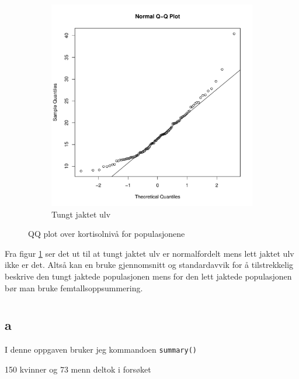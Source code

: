 \begin{figure}[H]
\begin{subfigure}{0.5\textwidth}
        \includegraphics[width=\linewidth]{TUNGT.pdf}
        \caption{Tungt jaktet ulv}
    \end{subfigure}
    \caption{QQ plot over kortisolnivå for populasjonene}
    \label{fig:2G}
\end{figure}

Fra figur \ref{fig:2G} ser det ut til at tungt jaktet ulv er normalfordelt mens lett jaktet ulv ikke er det. Altså kan en bruke gjennomsnitt og standardavvik for å tilstrekkelig beskrive den tungt jaktede populasjonen mens for den lett jaktede populasjonen bør man bruke femtallsoppsummering.

\pagebreak
\section{}

\subsection*{a}

I denne oppgaven bruker jeg kommandoen \texttt{summary()}

150 kvinner og 73 menn deltok i forsøket

